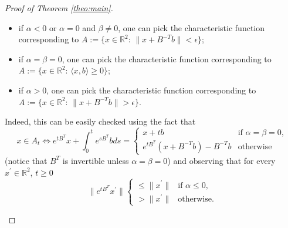 \documentclass[preprint]{elsarticle}
\theoremstyle{definition}
\def\RR{\mathbb{R}}
\begin{document}
\begin{proof}[Proof of Theorem \ref{theo:main}]
\begin{enumerate}
\begin{itemize}
    \item if $\alpha<0$ or $\alpha=0$ and $\beta \neq 0$, one can pick the characteristic function corresponding to $A:=\{x \in \RR^2:\, \|x+B^{-T}b\|<\epsilon\}$;
    \item if $\alpha=\beta=0$, one can pick the characteristic function corresponding to $A:=\{x \in \RR^2:\, \langle x,b\rangle \geq 0\}$;
    \item if $\alpha >0$, one can pick the characteristic function corresponding to $A:=\{x \in \RR^2:\, \|x+B^{-T}b\|>\epsilon\}$.
\end{itemize}
Indeed, this can be easily checked using the fact that
$$x \in A_t \Leftrightarrow e^{tB^T}x+\int_0^t e^{sB^T}b ds=\begin{cases} x+tb & \text{if }\alpha=\beta=0,\\e^{tB^T}(x+B^{-T}b)-B^{-T}b & \text{otherwise}\end{cases}$$
(notice that $B^T$ is invertible unless $\alpha=\beta=0$) and observing that for every $x^\prime \in \RR^2$, $t \geq 0$
$$\|e^{tB^{T}}x^\prime\|\begin{cases} \leq \|x^\prime\| & \text{if } \alpha \leq 0,\\
>\|x^\prime\| & \text{otherwise.}\end{cases}$$
\end{enumerate}
\end{proof}



\end{document}
